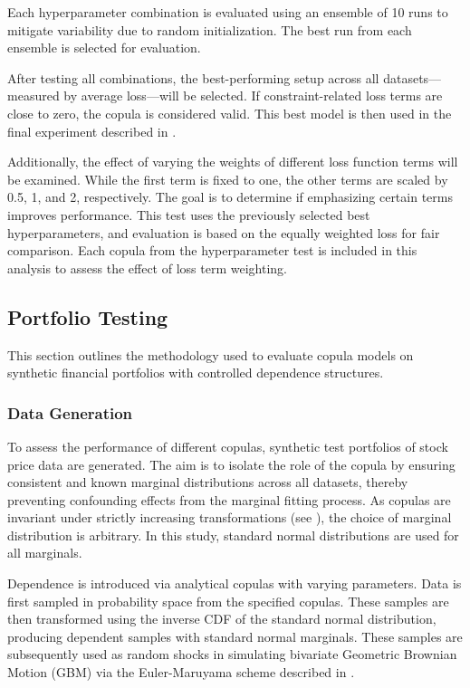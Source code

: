 Each hyperparameter combination is evaluated using an ensemble of 10 runs to mitigate variability due to random initialization. The best run from each ensemble is selected for evaluation.

After testing all combinations, the best-performing setup across all datasets—measured by average loss—will be selected. If constraint-related loss terms are close to zero, the copula is considered valid. This best model is then used in the final experiment described in .

Additionally, the effect of varying the weights of different loss function terms will be examined. While the first term is fixed to one, the other terms are scaled by 0.5, 1, and 2, respectively. The goal is to determine if emphasizing certain terms improves performance. This test uses the previously selected best hyperparameters, and evaluation is based on the equally weighted loss for fair comparison. Each copula from the hyperparameter test is included in this analysis to assess the effect of loss term weighting.


\subsection{Portfolio Testing}\label{sec:PortfolioTesting}
This section outlines the methodology used to evaluate copula models on synthetic financial portfolios with controlled dependence structures.

\subsubsection{Data Generation}
To assess the performance of different copulas, synthetic test portfolios of stock price data are generated. The aim is to isolate the role of the copula by ensuring consistent and known marginal distributions across all datasets, thereby preventing confounding effects from the marginal fitting process. As copulas are invariant under strictly increasing transformations (see ), the choice of marginal distribution is arbitrary. In this study, standard normal distributions are used for all marginals.

Dependence is introduced via analytical copulas with varying parameters. Data is first sampled in probability space from the specified copulas. These samples are then transformed using the inverse CDF of the standard normal distribution, producing dependent samples with standard normal marginals. These samples are subsequently used as random shocks in simulating bivariate Geometric Brownian Motion (GBM) via the Euler-Maruyama scheme described in .

